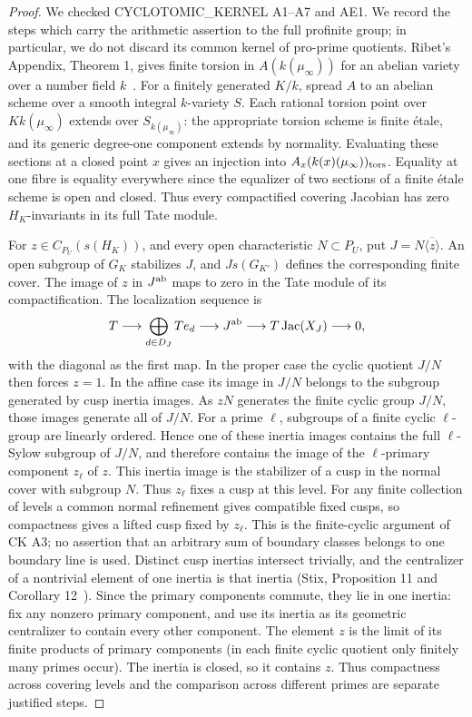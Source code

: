 \begin{proof}
We checked CYCLOTOMIC\_KERNEL A1--A7 and AE1. We record the steps
which carry the arithmetic assertion to the full profinite group;
in particular, we do not discard its common kernel of pro-prime
quotients. Ribet's Appendix, Theorem 1, gives finite torsion in
$A(k(\mu_\infty))$ for an abelian variety over a number field
$k$~\cite{F-Ribet}. For a finitely generated $K/k$, spread $A$ to an
abelian scheme over a smooth integral $k$-variety $S$. Each rational
torsion point over $Kk(\mu_\infty)$ extends over $S_{k(\mu_\infty)}$:
the appropriate torsion scheme is finite \'etale, and its generic
degree-one component extends by normality. Evaluating these sections
at a closed point $x$ gives an injection into
$A_x(k(x)(\mu_\infty))_{\rm tors}$. Equality at one fibre is equality
everywhere since the equalizer of two sections of a finite \'etale
scheme is open and closed. Thus every compactified covering Jacobian
has zero $H_K$-invariants in its full Tate module.

For $z\in C_{P_U}(s(H_K))$, and every open characteristic
$N\subset P_U$, put $J=N\overline{\langle z\rangle}$. An open
subgroup of $G_K$ stabilizes $J$, and $Js(G_{K'})$ defines the
corresponding finite cover. The image of $z$ in $J^{\rm ab}$ maps
to zero in the Tate module of its compactification. The localization
sequence is
\[
 T\longrightarrow\bigoplus_{d\in D_J} T e_d
 \longrightarrow J^{\rm ab}\longrightarrow T\operatorname{Jac}(X_J)
 \longrightarrow0,
\]
with the diagonal as the first map. In the proper case the cyclic
quotient $J/N$ then forces $z=1$. In the affine case its image in
$J/N$ belongs to the subgroup generated by cusp inertia images.
As $zN$ generates the finite cyclic group $J/N$, those images generate
all of $J/N$. For a prime $\ell$, subgroups of a finite cyclic
$\ell$-group are linearly ordered. Hence one of these inertia images
contains the full $\ell$-Sylow subgroup of $J/N$, and therefore
contains the image of the $\ell$-primary component $z_\ell$ of $z$.
This inertia image is the stabilizer of a cusp in the normal cover
with subgroup $N$. Thus $z_\ell$ fixes a cusp at this level.
For any finite collection of levels a common normal refinement
gives compatible fixed cusps, so compactness gives a lifted cusp
fixed by $z_\ell$. This is the finite-cyclic argument of CK A3;
no assertion that an arbitrary sum of boundary classes belongs
to one boundary line is used. Distinct cusp inertias
intersect trivially, and the centralizer of a nontrivial element of
one inertia is that inertia (Stix, Proposition 11 and Corollary
12~\cite{F-Stix}). Since the primary components commute, they lie in
one inertia: fix any nonzero primary component, and use its
inertia as its geometric centralizer to contain every other
component. The element $z$ is the limit of its finite products
of primary components (in each finite cyclic quotient only
finitely many primes occur). The inertia is closed, so it
contains $z$. Thus compactness across covering levels and the
comparison across different primes are separate justified steps.


\end{proof}
